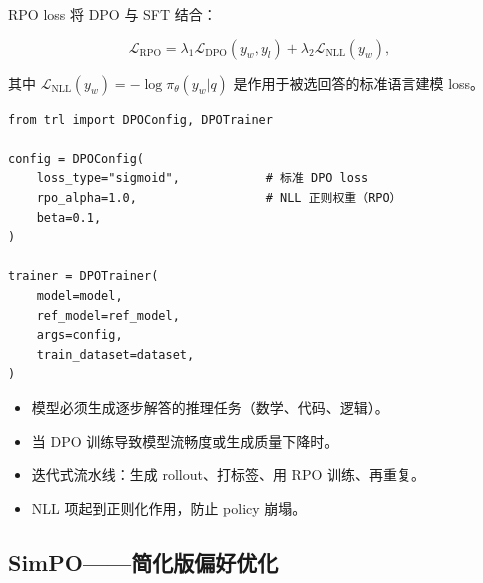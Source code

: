 RPO loss 将 DPO 与 SFT 结合：

\[
\mathcal{L}_{\text{RPO}} =
    \lambda_1 \mathcal{L}_{\text{DPO}}(y_w, y_l)
    + \lambda_2 \mathcal{L}_{\text{NLL}}(y_w),
\]

其中 $\mathcal{L}_{\text{NLL}}(y_w) = -\log \pi_\theta(y_w|q)$ 是作用于被选回答的标准语言建模 loss。

\begin{examplebox}
\begin{lstlisting}[style=pythonstyle]
from trl import DPOConfig, DPOTrainer

config = DPOConfig(
    loss_type="sigmoid",            # 标准 DPO loss
    rpo_alpha=1.0,                  # NLL 正则权重（RPO）
    beta=0.1,
)

trainer = DPOTrainer(
    model=model,
    ref_model=ref_model,
    args=config,
    train_dataset=dataset,
)
\end{lstlisting}
\end{examplebox}

\begin{keybox}
\begin{itemize}
  \item 模型必须生成逐步解答的推理任务（数学、代码、逻辑）。
  \item 当 DPO 训练导致模型流畅度或生成质量下降时。
  \item 迭代式流水线：生成 rollout、打标签、用 RPO 训练、再重复。
  \item NLL 项起到正则化作用，防止 policy 崩塌。
\end{itemize}
\end{keybox}

\subsection{SimPO——简化版偏好优化}
\label{sec:simpo}

